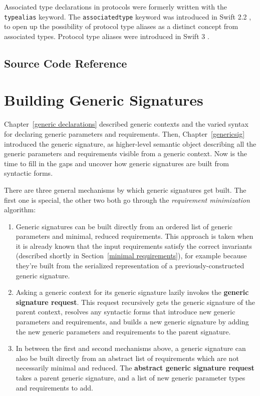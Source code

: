 \documentclass[a4paper,headsepline,bibliography=totoc,toc=flat,fleqn,twoside=semi]{scrbook}
\theoremstyle{definition}
\theoremstyle{definition}
\theoremstyle{definition}
\newcommand{\ifWIP}{\iffalse}
\begin{document}
Associated type declarations in protocols were formerly written with the \texttt{typealias} keyword. The \texttt{associatedtype} keyword was introduced in Swift 2.2 \cite{se0011}, to open up the possibility of protocol type aliases as a distinct concept from associated types. Protocol type aliases were introduced in Swift 3 \cite{se0092}.
\fi

\section{Source Code Reference}

\ifWIP
TODO:
\fi

\chapter{Building Generic Signatures}\label{building generic signatures}

\ifWIP
Chapter~\ref{generic declarations} described generic contexts and the varied syntax for declaring generic parameters and requirements. Then, Chapter~\ref{genericsig} introduced the generic signature, as higher-level semantic object describing all the generic parameters and requirements visible from a generic context. Now is the time to fill in the gaps and uncover how generic signatures are built from syntactic forms.

There are three general mechanisms by which generic signatures get built. The first one is special, the other two both go through the \emph{requirement minimization} algorithm:
\begin{enumerate}
\item Generic signatures can be built directly from an ordered list of generic parameters and minimal, reduced requirements. This approach is taken when it is already known that the input requirements satisfy the correct invariants (described shortly in Section~\ref{minimal requirements}), for example because they're built from the serialized representation of a previously-constructed generic signature.
\item Asking a generic context for its generic signature lazily invokes the \textbf{generic signature request}. This request recursively gets the generic signature of the parent context, resolves any syntactic forms that introduce new generic parameters and requirements, and builds a new generic signature by adding the new generic parameters and requirements to the parent signature.
\item In between the first and second mechanisms above, a generic signature can also be built directly from an abstract list of requirements which are not necessarily minimal and reduced. The \textbf{abstract generic signature request} takes a parent generic signature, and a list of new generic parameter types and requirements to add.
\end{enumerate}
\end{document}
